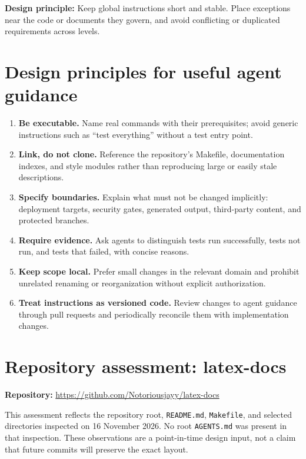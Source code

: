\documentclass[11pt,letterpaper]{article}
\begin{document}
\begin{neutralbox}
\textbf{Design principle:} Keep global instructions short and stable. Place exceptions near the code or documents they govern, and avoid conflicting or duplicated requirements across levels.
\end{neutralbox}

\section{Design principles for useful agent guidance}

\begin{enumerate}[label=\textcolor{accentdark}{\bfseries\arabic*.}]
\item \textbf{Be executable.} Name real commands with their prerequisites; avoid generic instructions such as ``test everything'' without a test entry point.
\item \textbf{Link, do not clone.} Reference the repository's Makefile, documentation indexes, and style modules rather than reproducing large or easily stale descriptions.
\item \textbf{Specify boundaries.} Explain what must not be changed implicitly: deployment targets, security gates, generated output, third-party content, and protected branches.
\item \textbf{Require evidence.} Ask agents to distinguish tests run successfully, tests not run, and tests that failed, with concise reasons.
\item \textbf{Keep scope local.} Prefer small changes in the relevant domain and prohibit unrelated renaming or reorganization without explicit authorization.
\item \textbf{Treat instructions as versioned code.} Review changes to agent guidance through pull requests and periodically reconcile them with implementation changes.
\end{enumerate}

\section{Repository assessment: latex-docs}

\textbf{Repository:} \url{https://github.com/Notoriousjayy/latex-docs}

This assessment reflects the repository root, \texttt{README.md}, \texttt{Makefile}, and selected directories inspected on 16 November 2026. No root \texttt{AGENTS.md} was present in that inspection. These observations are a point-in-time design input, not a claim that future commits will preserve the exact layout.
\end{document}
